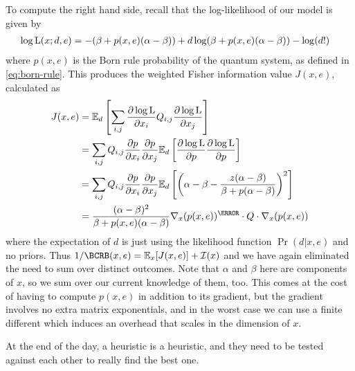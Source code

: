 \documentclass[aps,nofootinbib,twocolumn,superscriptaddress]{revtex4}
\newcommand{\mps}{x}
\newcommand{\eps}{e}
\newcommand{\data}{d}
\begin{document}
To compute the right hand side, recall that the log-likelihood of 
our model is given by
\begin{align}
    \log\Lhood(\mps;\data,\eps)
        &= -(\beta+p(\mps,\eps)(\alpha-\beta)) 
            + \data\log(\beta+p(\mps,\eps)(\alpha-\beta))
            - \log(\data!)
\end{align}
where $p(\mps,\eps)$ is the Born rule probability of the quantum 
system, as defined in \autoref{eq:born-rule}.
This produces the weighted Fisher information value $J(\mps,\eps)$,
calculated as
\begin{align}
    J(\mps,\eps) &= \expect_\data \left[
            \sum_{i,j} 
            \frac{\partial\log\Lhood}{\partial\mps_i}Q_{i,j}
            \frac{\partial\log\Lhood}{\partial\mps_j} 
        \right] \nonumber \\
        &= \sum_{i,j} Q_{i,j}
        \frac{\partial p}{\partial\mps_i}
        \frac{\partial p}{\partial\mps_j}
        \expect_\data \left[
            \frac{\partial\log\Lhood}{\partial p}
            \frac{\partial\log\Lhood}{\partial p}
        \right] \nonumber \\
        &= \sum_{i,j} Q_{i,j}
        \frac{\partial p}{\partial\mps_i}
        \frac{\partial p}{\partial\mps_j}
        \expect_\data \left[
            \left(
                \alpha-\beta-\frac{z(\alpha-\beta)}{\beta+p(\alpha-\beta)}
            \right)^2
        \right] \nonumber \\
        &= \frac{(\alpha-\beta)^2}{\beta+p(\mps,\eps)(\alpha-\beta)}
            \nabla_\mps(p(\mps,\eps))^\T\cdot Q\cdot \nabla_\mps(p(\mps,\eps))
\end{align}
where the expectation of $\data$ is just using the likelihood function
$\Pr(\data|\mps,\eps)$ and no priors.
Thus $1/\BCRB(\mps,\eps)=\expect_\mps [J(\mps,\eps)]+\mathcal{I}(\mps)$
and we have again eliminated the need to sum over distinct outcomes.
Note that $\alpha$ and $\beta$ here are components of $\mps$, so we
sum over our current knowledge of them, too.
This comes at the cost of having to compute $p(\mps,\eps)$ in addition
to its gradient, but the gradient involves no extra matrix exponentials,
and in the worst case we can use a finite different which induces 
an overhead that scales in the dimension of $\mps$.

At the end of the day, a heuristic is a heuristic, and they need to 
be tested against each other to really find the best one.
\end{document}
